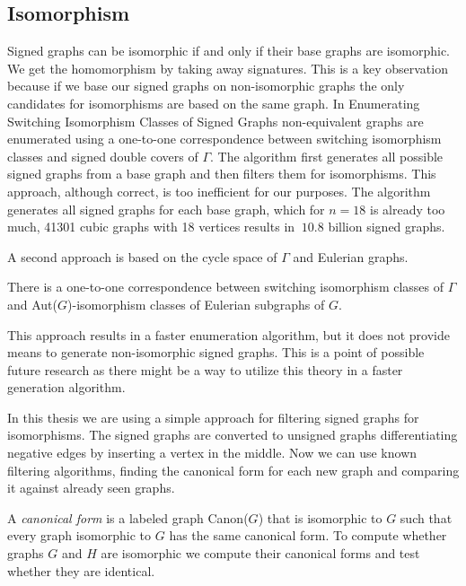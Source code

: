 \subsection{Isomorphism}

Signed graphs can be isomorphic if and only if their base graphs are isomorphic. We get the homomorphism by taking away signatures. This is a key observation because if we base our signed graphs on non-isomorphic graphs the only candidates for isomorphisms are based on the same graph. In Enumerating Switching Isomorphism Classes of Signed Graphs\cite{enumerating-switching-isomorphisms} non-equivalent graphs are enumerated using a one-to-one correspondence between switching isomorphism classes and signed double covers of $\Gamma$. The algorithm first generates all possible signed graphs from a base graph and then filters them for isomorphisms. This approach, although correct, is too inefficient for our purposes. The algorithm generates all signed graphs for each base graph, which for $n = 18$ is already too much, 41301 cubic graphs with 18 vertices results in $~10.8$ billion signed graphs.

A second approach is based on the cycle space of $\Gamma$ and Eulerian graphs.

\begin{theorem}
    There is a one-to-one correspondence between switching isomorphism classes of $\Gamma$ and Aut($G$)-isomorphism classes of Eulerian subgraphs of $G$.
\end{theorem}

This approach results in a faster enumeration algorithm, but it does not provide means to generate non-isomorphic signed graphs. This is a point of possible future research as there might be a way to utilize this theory in a faster generation algorithm.

In this thesis we are using a simple approach for filtering signed graphs for isomorphisms. The signed graphs are converted to unsigned graphs differentiating negative edges by inserting a vertex in the middle. Now we can use known filtering algorithms, finding the canonical form for each new graph and comparing it against already seen graphs.

\begin{definition}
    A \textit{canonical form} is a labeled graph Canon($G$) that is isomorphic to $G$ such that every graph isomorphic to $G$ has the same canonical form. To compute whether graphs $G$ and $H$ are isomorphic we compute their canonical forms and test whether they are identical.
\end{definition}

